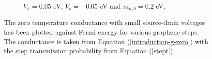 \begin{figure}[h]
\begin{subfigure}[h]{0.3\textwidth}
				\caption{$V_{a}=0.05$ eV, $V_{b}=-0.05$ eV and $m_{a,b}=0.2$ eV.}
			\end{subfigure}
			\caption{The zero temperature conductance with small source-drain voltages has been plotted against Fermi energy for various graphene steps. The conductance is taken from Equation (\ref{introduction-g-zero}) with the step transmission probability from Equation (\ref{stept}).} 
			\label{step-g}
		\end{figure}
%
